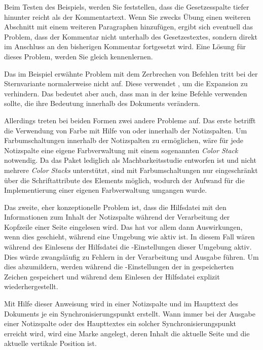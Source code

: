 Beim Testen des Beispiels, werden Sie feststellen, dass die Gesetzes\-spalte
tiefer hinunter reicht als der Kommentartext. Wenn Sie
zwecks Übung einen weiteren Abschnitt mit einem weiteren Paragraphen
hinzufügen, ergibt sich eventuell das Problem, dass der Kommentar nicht
unterhalb des Gesetzestextes, sondern direkt im Anschluss an den bisherigen
Kommentar fortgesetzt wird. Eine Lösung für dieses Problem, werden Sie gleich
kennenlernen.

Das im Beispiel erwähnte
Problem mit dem Zerbrechen von Befehlen tritt bei der
Sternvariante normalerweise nicht auf. Diese
verwendet , um die Expansion zu verhindern. Das bedeutet
aber auch, dass man in der  keine Befehle verwenden sollte, die
ihre Bedeutung innerhalb des Dokuments verändern.

Allerdings treten bei beiden Formen zwei andere Probleme
auf. Das erste betrifft die Verwendung von Farbe mit Hilfe von
 oder 
innerhalb der Notizspalten. Um Farbumschaltungen innerhalb der Notizspalten zu
ermöglichen, wäre für jede Notizspalte eine eigene Farbverwaltung mit einem
sogenannten \emph{Color Stack} notwendig. Da das Paket lediglich als
Machbarkeitsstudie entworfen ist und \XeTeX{} nicht mehrere \emph{Color
  Stacks} unterstützt, sind mit \XeTeX{} Farbumschaltungen nur eingeschränkt
über die Schriftattribute des Elements  möglich, wodurch der Aufwand für die Implementierung einer
eigenen Farbverwaltung umgangen wurde.

Das zweite, eher konzeptionelle Problem ist, dass die
Hilfsdatei mit den Informationen zum Inhalt der Notizspalte während der
Verarbeitung der Kopfzeile einer Seite eingelesen wird. Das hat vor allem dann
Auswirkungen, wenn dies geschieht, während eine Umgebung wie
 aktiv ist. In diesem Fall wären während des Einlesens
der Hilfsdatei die -Einstellungen dieser Umgebung aktiv. Dies
würde zwangsläufig zu Fehlern in der Verarbeitung und Ausgabe führen. Um dies
abzumildern, werden während  die
-Einstellungen der in 
gespeicherten Zeichen gespeichert und während dem Einlesen der Hilfsdatei
explizit wiederhergestellt.%
\EndIndexGroup


\begin{Declaration}
\end{Declaration}
Mit Hilfe dieser Anweisung wird in einer Notizspalte und im Haupttext des
Dokuments je ein
Synchronisierungspunkt
erstellt. Wann immer bei der Ausgabe einer Notizspalte oder des Haupttextes
ein solcher Synchronisierungspunkt erreicht wird, wird eine Marke angelegt,
deren Inhalt die aktuelle Seite und die aktuelle vertikale Position ist.

